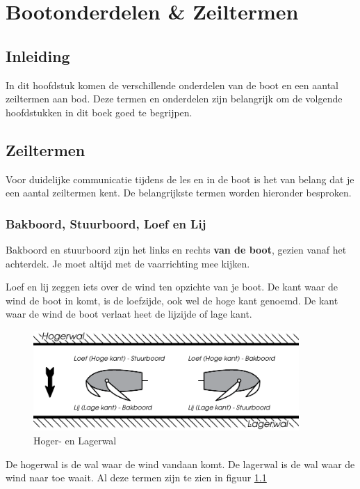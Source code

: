 \chapter{Bootonderdelen \& Zeiltermen}
\section{Inleiding}
In dit hoofdstuk komen de verschillende onderdelen van de boot en een aantal zeiltermen aan bod. Deze termen en onderdelen zijn belangrijk om de volgende hoofdstukken in dit boek goed te begrijpen.

\section{Zeiltermen}
Voor duidelijke communicatie tijdens de les en in de boot is het van belang dat je een aantal zeiltermen kent. De belangrijkste termen worden hieronder besproken.

\subsection{Bakboord, Stuurboord, Loef en Lij}
Bakboord en stuurboord zijn het links en rechts \textbf{van de boot}, gezien vanaf het achterdek. Je moet altijd met de vaarrichting mee kijken. 

Loef en lij zeggen iets over de wind ten opzichte van je boot. De kant waar de wind de boot in komt, is de loefzijde, ook wel de hoge kant genoemd. De kant waar de wind de boot verlaat heet de lijzijde of lage kant. 
\begin{figure}[ht]
	\centering
	\includegraphics[width=0.9\textwidth]{Hoofdstukken/Onderdelen/pdf/wallen.pdf}
	\caption{Hoger- en Lagerwal}
	\centering
	\label{pic:hoog_laag}
\end{figure}

De hogerwal is de wal waar de wind vandaan komt. De lagerwal is de wal waar de wind naar toe waait. Al deze termen zijn te zien in figuur \ref{pic:hoog_laag}

\vfil\newpage

